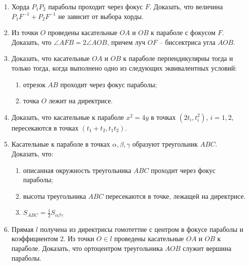 \begin{enumerate}
	\item Хорда $P_1 P_2$ параболы проходит через фокус $F$. Доказать, что величина $P_1F^{-1} + P_2F^{-1}$ не зависит от выбора хорды.

	\item Из точки $O$ проведены касательные $OA$ и $OB$ к параболе с фокусом $F$. Доказать, что $\angle AFB = 2\angle AOB$, причем луч $OF$ -- биссектриса угла $AOB$.

	\item Доказать, что касательные $OA$ и $OB$ к параболе перпендикулярны тогда и только тогда, когда выполнено одно из следующих эквивалентных условий:
	\begin{enumerate}
		\item отрезок $AB$ проходит через фокус параболы;
		\item точка $O$ лежит на директрисе.
	\end{enumerate}

	\item Доказать, что касательные к параболе $x^2 = 4y$ в точках $(2t_i, t_i^2)$, $i = 1, 2$, пересекаются в точках $(t_1 + t_2, t_1 t_2)$.

	\item Касательные к параболе в точках $\alpha, \beta, \gamma$ образуют треугольник $ABC$. Доказать, что:
	\begin{enumerate}
		\item описанная окружность треугольника $ABC$ проходит через фокус параболы;
		\item высоты треугольника $ABC$ пересекаются в точке, лежащей на директрисе.
		\item $S_{ABC} = \frac{1}{2} S_{\alpha \beta \gamma}$
	\end{enumerate}

	\item Прямая $l$ получена из директрисы гомотеттие с центром в фокусе параболы и коэффициентом 2. Из точки $O \in l$ проведены касательные $OA$ и $OB$ к параболе. Доказать, что ортоцентром треугольника $AOB$ служит вершина параболы.


\end{enumerate}

